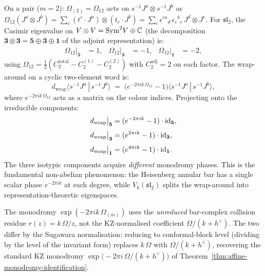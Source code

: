 \begin{computation}
\begin{enumerate}[label=\textup{(\alph*)}]
 On a pair ($m=2$): $\Omega_{(2)} = \Omega_{12}$
 acts on $s^{-1}J^a \otimes s^{-1}J^b$ as
 $\Omega_{12}(J^a \otimes J^b) = \sum_c
 (t^c \cdot J^a) \otimes (t_c \cdot J^b)
 = \sum_c \epsilon^{ca}{}_d\, \epsilon_{c}{}^{b}{}_e\,
 J^d \otimes J^e$.
 For $\mathfrak{sl}_2$, the Casimir eigenvalue on
 $V \otimes V = \mathrm{Sym}^2 V \oplus \mathbb{C}$
 (the decomposition $\mathbf{3} \otimes \mathbf{3}
 = \mathbf{5} \oplus \mathbf{3} \oplus \mathbf{1}$
 of the adjoint representation) is:
 \begin{align}
 \Omega_{12}\big|_{\mathbf{5}} &= 1,
 &
 \Omega_{12}\big|_{\mathbf{3}} &= -1,
 &
 \Omega_{12}\big|_{\mathbf{1}} &= -2,
 \label{eq:sl2-casimir-eigenvalues}
 \end{align}
 using $\Omega_{12} = \tfrac{1}{2}(C_2^{\mathrm{total}}
 - C_2^{(1)} - C_2^{(2)})$ with $C_2^{\mathrm{adj}} = 2$
 on each factor.
 The wrap-around on a cyclic two-element word is:
 \begin{equation}\label{eq:sl2-ann-wrap-2}
 d_{\mathrm{wrap}}
 \langle s^{-1}J^a\,|\,s^{-1}J^b\rangle
 \;=\;
 \bigl(
 e^{-2\pi ik\,\Omega_{12}} - 1
 \bigr)
 \langle s^{-1}J^a\,|\,s^{-1}J^b\rangle,
 \end{equation}
 where $e^{-2\pi ik\,\Omega_{12}}$ acts as a
 matrix on the colour indices.
 Projecting onto the irreducible components:
 \begin{align}
 d_{\mathrm{wrap}}\big|_{\mathbf{5}}
 &= (e^{-2\pi ik} - 1) \cdot \mathrm{id}_{\mathbf{5}},
 \notag \\[3pt]
 d_{\mathrm{wrap}}\big|_{\mathbf{3}}
 &= (e^{2\pi ik} - 1) \cdot \mathrm{id}_{\mathbf{3}},
 \label{eq:sl2-ann-wrap-isotypic}\\[3pt]
 d_{\mathrm{wrap}}\big|_{\mathbf{1}}
 &= (e^{4\pi ik} - 1) \cdot \mathrm{id}_{\mathbf{1}}.
 \notag
 \end{align}
 The three isotypic components acquire \emph{different}
 monodromy phases. This is the fundamental
 non-abelian phenomenon: the Heisenberg annular bar
 has a single scalar phase $e^{-2\pi ik}$ at each
 degree, while $V_k(\mathfrak{sl}_2)$ splits the
 wrap-around into representation-theoretic eigenspaces.

 The monodromy $\exp(-2\pi ik\,\Omega_{(m)})$ uses the
 \emph{unreduced} bar-complex collision residue
 $r(z) = k\,\Omega/z$, not the KZ-normalised coefficient
 $\Omega/(k+h^\vee)$. The two differ by the Sugawara
 normalisation: reducing to conformal-block level
 (dividing by the level of the invariant form) replaces
 $k\,\Omega$ with $\Omega/(k+h^\vee)$, recovering
 the standard KZ monodromy
 $\exp\!\bigl({-}2\pi i\,\Omega/(k+h^\vee)\bigr)$
 of Theorem~\textup{\ref{thm:affine-monodromy-identification}}.
\end{enumerate}


\end{computation}
